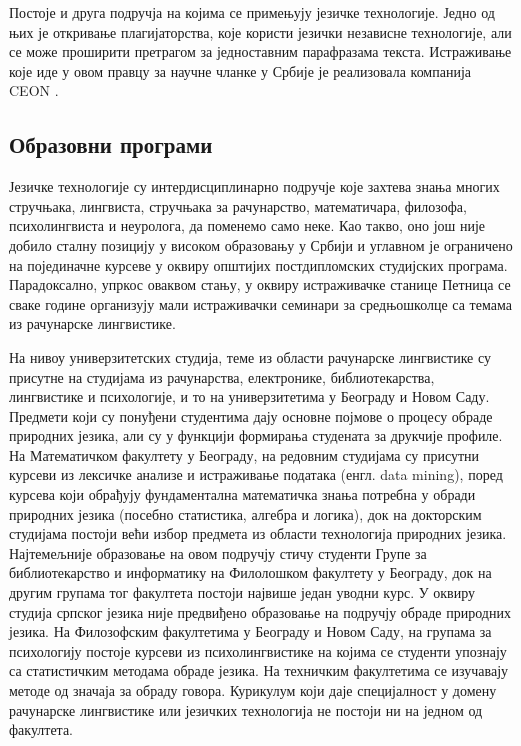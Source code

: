 {\begin{multicols}{2}
Постоје и друга подручја на којима се примењују језичке технологије. Једно од њих је откривање плагијаторства, које користи језички независне технологије, али се може проширити  претрагом за једноставним парафразама текста. Истраживање које иде у овом правцу за научне чланке у Србије је реализовала компанија CEON \cite{CEON}.

 \subsection {Образовни програми}
 
Језичке технологије су интердисциплинарно подручје које захтева знања многих стручњака, лингвиста, стручњака за рачунарство, математичара, филозофа, психолингвиста и неуролога, да поменемо само неке. Као такво, оно још није добило сталну позицију у високом образовању у Србији и углавном је ограничено на појединачне курсеве у оквиру општијих постдипломских студијских програма. Парадоксално, упркос оваквом стању, у оквиру истраживачке станице Петница \cite{PETNICA} се сваке године организују мали истраживачки семинари за средњошколце са темама из рачунарске лингвистике. 

На нивоу универзитетских студија, теме из области рачунарске лингвистике су присутне на студијама из рачунарства, електронике, библиотекарства, лингвистике и психологије, и то на универзитетима у Београду и Новом Саду. Предмети који су понуђени студентима дају основне појмове о процесу обраде природних језика, али су у функцији формирања студената за друкчије профиле. На Математичком факултету у Београду, на редовним студијама су присутни курсеви из лексичке анализе и истраживање података (енгл. data mining), поред курсева који обрађују фундаментална математичка знања потребна у обради природних језика (посебно статистика, алгебра и логика), док на докторским студијама постоји већи избор предмета из области технологија природних језика. Најтемељније образовање на овом подручју стичу студенти Групе за библиотекарство и информатику на Филолошком факултету у Београду, док на другим групама тог факултета постоји највише један уводни курс. У оквиру студија српског језика није предвиђено образовање на подручју обраде природних језика. На Филозофским факултетима у Београду и Новом Саду, на групама за психологију постоје курсеви из психолингвистике на којима се студенти упознају са статистичким методама обраде језика. На техничким факултетима се изучавају методе од значаја за обраду говора. Курикулум који даје специјалност у домену рачунарске лингвистике или језичких технологија не постоји ни на једном од факултета. 


\end{multicols}}
